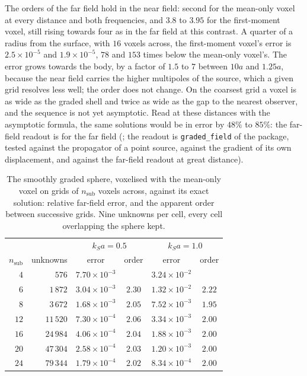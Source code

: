 \documentclass[11pt,a4paper]{article}
\begin{document}
The orders of the far field hold in the near field: second for the mean-only voxel at every distance
and both frequencies, and $3.8$ to $3.95$ for the first-moment voxel, still rising towards four as in
the far field at this contrast. A quarter of a radius from the surface, with $16$ voxels across, the
first-moment voxel's error is $2.5\times10^{-5}$ and $1.9\times10^{-5}$, $78$ and $153$ times below the
mean-only voxel's. The error grows towards the body, by a factor of $1.5$ to $7$ between $10a$ and $1.25a$,
because the near field carries the higher multipoles of the source, which a given grid resolves less
well; the order does not change. On the coarsest grid a voxel is as wide as the graded shell and twice as
wide as the gap to the nearest observer, and the sequence is not yet asymptotic. Read at these distances
with the asymptotic formula, the same solutions would be in error by $48\%$ to $85\%$: the far-field
readout is for the far field
(; the readout is
\texttt{graded\_field} of the package, tested against the propagator of a point source, against the
gradient of its own displacement, and against the far-field readout at great distance).

\begin{table}[htbp]
\centering
\caption{The smoothly graded sphere, voxelised with the mean-only voxel on grids of $n_{\mathrm{sub}}$
voxels across, against its exact solution: relative far-field error, and the apparent order between
successive grids. Nine unknowns per cell, every cell overlapping the sphere kept.}
\label{tab:spheregraded}
\small
\begin{tabular}{@{}rrcccc@{}}
\toprule
 & & \multicolumn{2}{c}{$k_Sa=0.5$} & \multicolumn{2}{c}{$k_Sa=1.0$} \\
$n_{\mathrm{sub}}$ & unknowns & error & order & error & order \\
\midrule
$4$  & $576$    & $7.70\times10^{-3}$ &        & $3.24\times10^{-2}$ &        \\
$6$  & $1\,872$  & $3.04\times10^{-3}$ & $2.30$ & $1.32\times10^{-2}$ & $2.22$ \\
$8$  & $3\,672$  & $1.68\times10^{-3}$ & $2.05$ & $7.52\times10^{-3}$ & $1.95$ \\
$12$ & $11\,520$ & $7.30\times10^{-4}$ & $2.06$ & $3.34\times10^{-3}$ & $2.00$ \\
$16$ & $24\,984$ & $4.06\times10^{-4}$ & $2.04$ & $1.88\times10^{-3}$ & $2.00$ \\
$20$ & $47\,304$ & $2.58\times10^{-4}$ & $2.03$ & $1.20\times10^{-3}$ & $2.00$ \\
$24$ & $79\,344$ & $1.79\times10^{-4}$ & $2.02$ & $8.34\times10^{-4}$ & $2.00$ \\
\bottomrule
\end{tabular}
\end{table}
\end{document}
